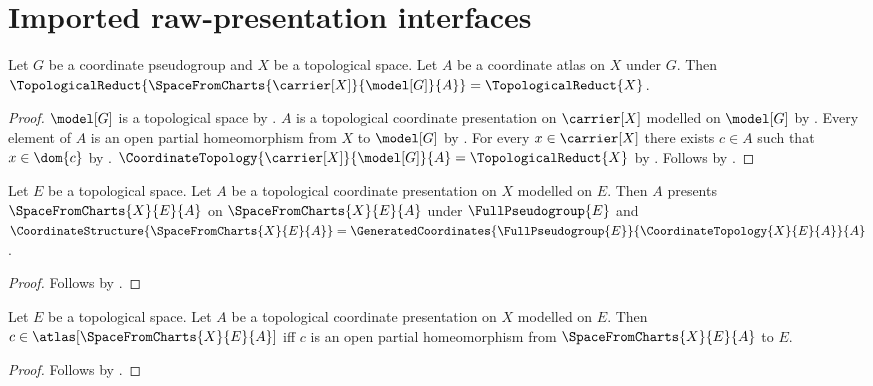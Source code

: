 \section{Imported raw-presentation interfaces}



\begin{theorem}\label{raw_atlas_topology_consumer}
    Let $G$ be a coordinate pseudogroup and $X$ be a topological space.
    Let $A$ be a coordinate atlas on $X$ under $G$.
    Then $\TopologicalReduct{\SpaceFromCharts{\carrier[X]}{\model[G]}{A}}=\TopologicalReduct{X}$.
\end{theorem}
\begin{proof}
    $\model[G]$ is a topological space by .
    $A$ is a topological coordinate presentation on $\carrier[X]$ modelled on $\model[G]$ by
        .
    Every element of $A$ is an open partial homeomorphism from $X$ to $\model[G]$ by
        .
    For every $x\in\carrier[X]$ there exists $c\in A$ such that $x\in\dom{c}$ by
        .
    $\CoordinateTopology{\carrier[X]}{\model[G]}{A}=\TopologicalReduct{X}$ by
        .
    Follows by .
\end{proof}

\begin{theorem}\label{raw_space_presentation_consumer}
    Let $E$ be a topological space.
    Let $A$ be a topological coordinate presentation on $X$ modelled on $E$.
    Then $A$ presents $\SpaceFromCharts{X}{E}{A}$ on $\SpaceFromCharts{X}{E}{A}$
        under $\FullPseudogroup{E}$ and
        $\CoordinateStructure{\SpaceFromCharts{X}{E}{A}}
            =\GeneratedCoordinates{\FullPseudogroup{E}}{\CoordinateTopology{X}{E}{A}}{A}$.
\end{theorem}
\begin{proof}
    Follows by .
\end{proof}

\begin{theorem}\label{raw_space_chart_consumer}
    Let $E$ be a topological space.
    Let $A$ be a topological coordinate presentation on $X$ modelled on $E$.
    Then $c\in\atlas[\SpaceFromCharts{X}{E}{A}]$ iff
        $c$ is an open partial homeomorphism from $\SpaceFromCharts{X}{E}{A}$ to $E$.
\end{theorem}
\begin{proof}
    Follows by .
\end{proof}

